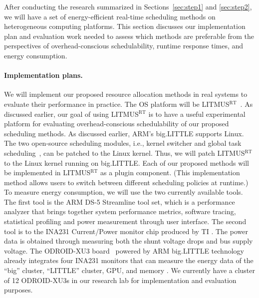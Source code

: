 After conducting the research summarized in Sections~\ref{sec:step1} and \ref{sec:step2}, we will have a set of energy-efficient real-time scheduling methods on heterogeneous computing platforms. This section discusses our implementation plan and evaluation work needed to assess which methods are preferable from the perspectives of overhead-conscious schedulability, runtime response times, and energy consumption. 

\vspace{-2mm} \paragraph{Implementation plans.} We will implement our proposed resource allocation methods in real systems to evaluate their performance in practice. The OS platform will be LITMUS$^{\textrm{RT}}$~\cite{LITMUS}. As discussed earlier, our goal of using LITMUS$^{\textrm{RT}}$ is to have a useful experimental platform for evaluating overhead-conscious schedulability of our proposed scheduling methods. 
As discussed earlier, ARM's big.LITTLE supports Linux. The two open-source scheduling modules, i.e., kernel switcher and global task scheduling~\cite{armscheduler}, can be patched to the Linux kernel. Thus, we will patch LITMUS$^{\textrm{RT}}$ to the Linux kernel running on big.LITTLE. 
Each of our proposed methods  will be implemented in LITMUS$^{\textrm{RT}}$ as a plugin component. (This implementation method allows users to switch between different scheduling policies at runtime.)  %
 To measure energy consumption, we will use the two currently available tools. The first tool is the ARM DS-5 Streamline tool set\cite{ARMDS5}, which is a performance analyzer that brings together system performance metrics, software tracing, statistical profiling and power measurement through user interface. The second tool is to the INA231 Current/Power monitor chip produced by TI \cite{israelssonenergy, INA231, hahnel2014heterogeneity}. The power data is obtained through measuring both the shunt voltage drops and bus supply voltage. The ODROID-XU3 board~\cite{ODROIDXU} powered by ARM big.LITTLE technology already integrates four INA231 monitors that can measure the energy data of the ``big'' cluster, ``LITTLE'' cluster, GPU, and memory \cite{hahnel2014heterogeneity}. We currently have a cluster of 12 ODROID-XU3s in our research lab for implementation and evaluation purposes.  

